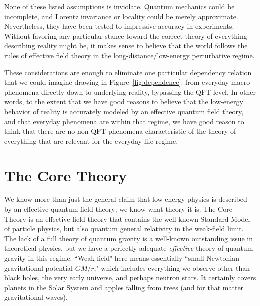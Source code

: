 \documentclass[12pt,letterpaper]{article}
\begin{document}
None of these listed assumptions is inviolate.
Quantum mechanics could be incomplete, and Lorentz invariance or locality could be merely approximate.
Nevertheless, they have been tested to impressive accuracy in experiments.
Without favoring any particular stance toward the correct theory of everything describing reality might be, it makes sense to believe that the world follows the rules of effective field theory in the long-distance/low-energy perturbative regime.

These considerations are enough to eliminate one particular dependency relation that we could imagine drawing in Figure~\ref{fig:dependence}: from everyday macro phenomena directly down to underlying reality, bypassing the QFT level.
In other words, to the extent that we have good reasons to believe that the low-energy behavior of reality is accurately modeled by an effective quantum field theory, and that everyday phenomena are within that regime, we have good reason to think that there are no non-QFT phenomena characteristic of the theory of everything that are relevant for the everyday-life regime.


\section{The Core Theory}
\label{sec:coretheory}

We know more than just the general claim that low-energy physics is described by an effective quantum field theory; we know what theory it is.
The Core Theory is an effective field theory that contains the well-known Standard Model of particle physics, but also quantum general relativity in the weak-field limit.
The lack of a full theory of quantum gravity is a well-known outstanding issue in theoretical physics, but we have a perfectly adequate \emph{effective} theory of quantum gravity in this regime.
``Weak-field" here means essentially ``small Newtonian gravitational potential $GM/r$," which includes everything we observe other than black holes, the very early universe, and perhaps neutron stars. 
It certainly covers planets in the Solar System and apples falling from trees (and for that matter gravitational waves).
\end{document}
